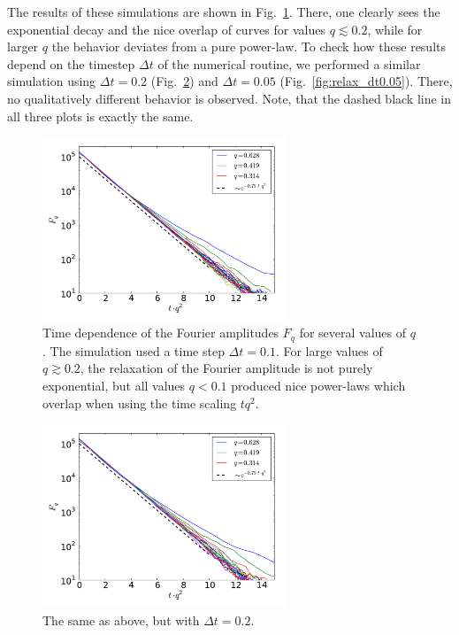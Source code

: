 \documentclass[a4paper,11pt]{scrartcl}
\begin{document}
The results of these simulations are shown in Fig.~\ref{fig:relax_dt0.1}.
There, one clearly sees the exponential decay and the nice overlap of curves for values $q\lesssim0.2$, while for larger $q$ the behavior deviates from a pure power-law.
To check how these results depend on the timestep $\Delta t$ of the numerical routine, we performed a similar simulation using $\Delta t=0.2$ (Fig.~\ref{fig:relax_dt0.2}) and $\Delta t=0.05$ (Fig.~\ref{fig:relax_dt0.05}).
There, no qualitatively different behavior is observed.
Note, that the dashed black line in all three plots is exactly the same.

\begin{figure}[t]
 \centering
  \includegraphics[width=0.65\textwidth]{../plot/relax_N10000000_010.pdf}
 \caption{Time dependence of the Fourier amplitudes $F_q$ for several values of $q$. The simulation used a time step $\Delta t=0.1$. For large values of $q\gtrsim0.2$, the relaxation of the Fourier amplitude is not purely exponential, but all values $q<0.1$ produced nice power-laws which overlap when using the time scaling $tq^2$.}
 \label{fig:relax_dt0.1}
\end{figure}

\begin{figure}[h]
 \centering
  \includegraphics[width=0.65\textwidth]{../plot/relax_N10000000_020.pdf}
 \caption{The same as above, but with $\Delta t=0.2$.}
 \label{fig:relax_dt0.2}
\end{figure}
\end{document}
